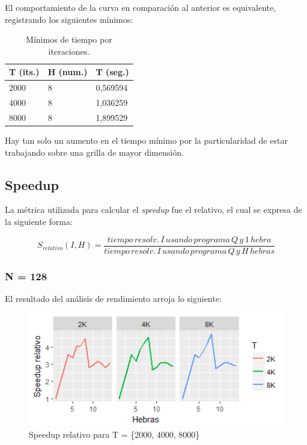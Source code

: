 \documentclass[jou]{apa6}
\begin{document}
El comportamiento de la curva en comparación al anterior es equivalente, registrando los siguientes mínimos:

\begin{table}[h]
\centering
\caption{Mínimos de tiempo por iteraciones.}
\label{my-label}
\begin{tabular}{@{}lll@{}}
\toprule
\multicolumn{1}{c}{T (its.)} & \multicolumn{1}{c}{H (num.)} & \multicolumn{1}{c}{T (seg.)} \\ \midrule
2000                         & 8                            & 0,569594                     \\
4000                         & 8                            & 1,036259                     \\
8000                         & 8                            & 1,899529                     \\ \bottomrule
\end{tabular}
\end{table}

Hay tan solo un aumento en el tiempo mínimo por la particularidad de estar trabajando sobre una grilla de mayor dimensión.

\FloatBarrier

\subsection{Speedup}
La métrica utilizada para calcular el \textit{speedup} fue el relativo, el cual se expresa de la siguiente forma:

\[
	S_{relativo}(I, H) = \frac{tiempo\, resolv.\, I\, usando\, programa\, Q\, y\, 1\, hebra}{tiempo\, resolv.\, I\, usando\, programa\, Q\, y\, H\, hebras}
\]

\subsubsection{N = 128}
El resultado del análisis de rendimiento arroja lo siguiente:

\begin{figure}[h]
	\includegraphics[width=\columnwidth]{srel-128px.png}
	\caption{Speedup relativo para T = \{2000, 4000, 8000\}}
	\label{fig:Figure3}
\end{figure}
\end{document}
